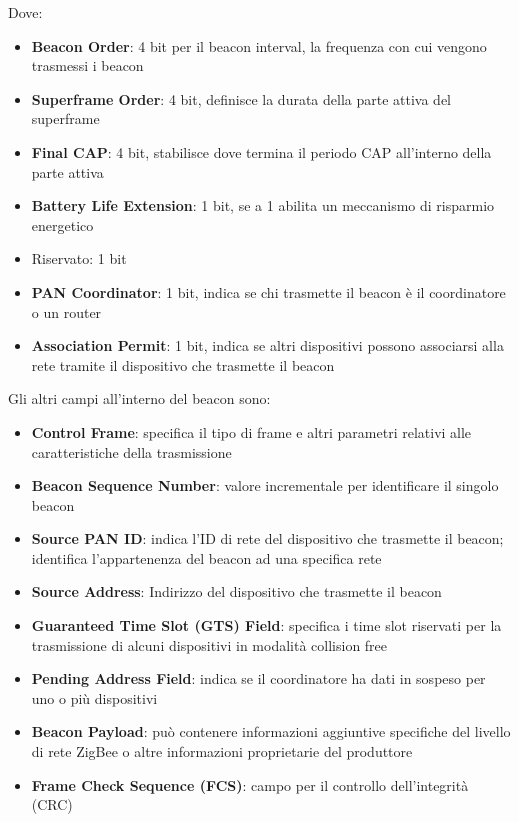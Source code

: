 Dove:
\begin{itemize}
	\item \textbf{Beacon Order}: 4 bit per il beacon interval, la frequenza con cui vengono trasmessi i beacon

	\item \textbf{Superframe Order}: 4 bit, definisce la durata della parte attiva del superframe

	\item \textbf{Final CAP}: 4 bit, stabilisce dove termina il periodo CAP all'interno della parte attiva

	\item \textbf{Battery Life Extension}: 1 bit, se a 1 abilita un meccanismo di risparmio energetico

	\item Riservato: 1 bit

	\item \textbf{PAN Coordinator}: 1 bit, indica se chi trasmette il beacon è il coordinatore o un router

	\item \textbf{Association Permit}: 1 bit, indica se altri dispositivi possono associarsi alla rete tramite il dispositivo che trasmette il beacon
\end{itemize}

Gli altri campi all'interno del beacon sono: 
\begin{itemize}
	\item \textbf{Control Frame}: specifica il tipo di frame e altri parametri relativi alle caratteristiche della trasmissione
    
	\item \textbf{Beacon Sequence Number}: valore incrementale per identificare il singolo beacon
    
	\item \textbf{Source PAN ID}: indica l'ID di rete del dispositivo che trasmette il beacon; identifica l'appartenenza del beacon ad una specifica rete
    
	\item \textbf{Source Address}: Indirizzo del dispositivo che trasmette il beacon
    
	\item \textbf{Guaranteed Time Slot (GTS) Field}: specifica i time slot riservati per la trasmissione di alcuni dispositivi in modalità collision free
    
	\item \textbf{Pending Address Field}: indica se il coordinatore ha dati in sospeso per uno o più dispositivi
    
	\item \textbf{Beacon Payload}: può contenere informazioni aggiuntive specifiche del livello di rete ZigBee o altre informazioni proprietarie del produttore
    
	\item \textbf{Frame Check Sequence (FCS)}: campo per il controllo dell'integrità (CRC)
\end{itemize}

